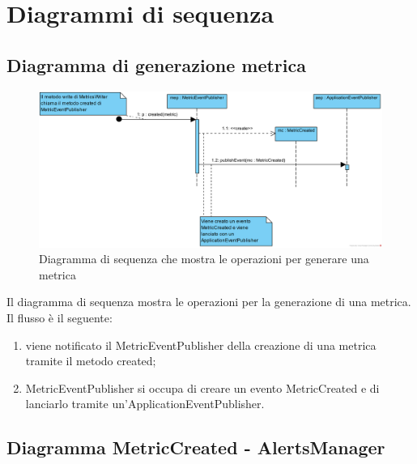 \section{Diagrammi di sequenza} \label{seqDiag}

	\subsection{Diagramma di generazione metrica}

        \begin{figure}[htbp]
            \centering
            \includegraphics[width=\textwidth]{./img/DiagrammiSequenza/generatedMetricEvent.png}
            \caption[Diagramma di sequenza di generazione metrica]{Diagramma di sequenza che mostra le operazioni per generare una metrica}
        \end{figure}
        Il diagramma di sequenza mostra le operazioni per la generazione di una metrica. Il flusso è il seguente:
        \begin{enumerate}
        	\item viene notificato il MetricEventPublisher della creazione di una metrica tramite il metodo created;
        	\item MetricEventPublisher si occupa di creare un evento MetricCreated e di lanciarlo tramite un'ApplicationEventPublisher.
        \end{enumerate}
        
    \newpage
    
    \subsection{Diagramma MetricCreated - AlertsManager}

